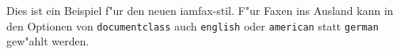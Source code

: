 \documentclass[12pt,german]{iamfax}
\begin{document}
\begin{iamfax}
Dies ist ein Beispiel f"ur den neuen iamfax-stil.
F"ur Faxen ins Ausland kann in den Optionen von \texttt{documentclass}
auch \texttt{english} oder \texttt{american} statt \texttt{german}
gew"ahlt werden. 
\end{iamfax}
\end{document}

